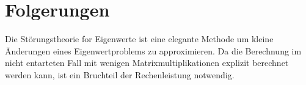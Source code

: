 %
%
%
\section{Folgerungen
\label{ew:section:folgerungen}}

Die Störungstheorie for Eigenwerte ist eine elegante Methode um kleine Änderungen eines Eigenwertproblems zu approximieren.
Da die Berechnung im nicht entarteten Fall mit wenigen Matrixmultiplikationen explizit berechnet werden kann, ist ein Bruchteil der Rechenleistung notwendig.


